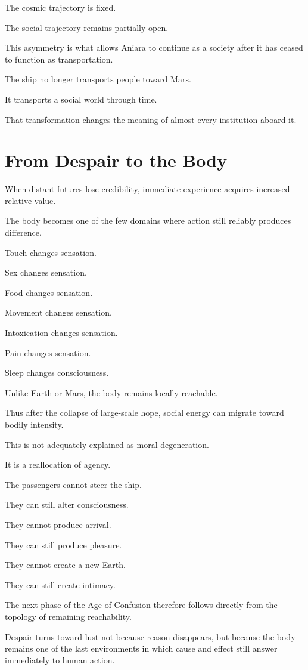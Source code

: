 \documentclass[11pt,oneside]{book}
\theoremstyle{definition}
\theoremstyle{remark}
\begin{document}
The cosmic trajectory is fixed.

The social trajectory remains partially open.

This asymmetry is what allows Aniara to continue as a society after it has ceased to function as transportation.

The ship no longer transports people toward Mars.

It transports a social world through time.

That transformation changes the meaning of almost every institution aboard it.

\section{From Despair to the Body}

When distant futures lose credibility, immediate experience acquires increased relative value.

The body becomes one of the few domains where action still reliably produces difference.

Touch changes sensation.

Sex changes sensation.

Food changes sensation.

Movement changes sensation.

Intoxication changes sensation.

Pain changes sensation.

Sleep changes consciousness.

Unlike Earth or Mars, the body remains locally reachable.

Thus after the collapse of large-scale hope, social energy can migrate toward bodily intensity.

This is not adequately explained as moral degeneration.

It is a reallocation of agency.

The passengers cannot steer the ship.

They can still alter consciousness.

They cannot produce arrival.

They can still produce pleasure.

They cannot create a new Earth.

They can still create intimacy.

The next phase of the Age of Confusion therefore follows directly from the topology of remaining reachability.

Despair turns toward lust not because reason disappears, but because the body remains one of the last environments in which cause and effect still answer immediately to human action.
\end{document}
